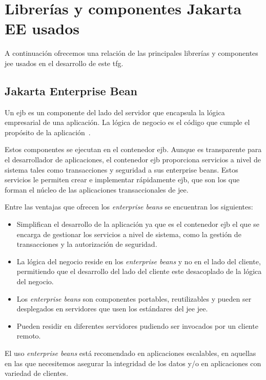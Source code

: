 \section{Librerías y componentes Jakarta EE usados}
\label{sec:componentesJakartaEE}

A continuación ofrecemos una relación de las principales librerías y componentes \acrshort{jee} usados en el desarrollo de este \acrshort{tfg}.

\subsection{Jakarta Enterprise Bean}
\label{sec:jeb}

Un \acrfull{ejb} es un componente del lado del servidor que encapsula la lógica empresarial de una aplicación. La lógica de negocio es el código que cumple el propósito de la aplicación~\cite{JEE7-Tutorial}.

Estos componentes se ejecutan en el contenedor \acrshort{ejb}. Aunque es transparente para el desarrollador de aplicaciones, el contenedor \acrshort{ejb} proporciona servicios a nivel de sistema tales como transacciones y seguridad a sus enterprise beans. Estos servicios le permiten crear e implementar rápidamente \acrshort{ejb}, que son los que forman el núcleo de las aplicaciones transaccionales de \acrshort{jee}.

Entre las ventajas que ofrecen los \textit{enterprise beans} se encuentran los siguientes:
\begin{itemize}
\item Simplifican el desarrollo de la aplicación ya que es el contenedor \acrshort{ejb} el que se encarga de gestionar los servicios a nivel de sistema, como la gestión de transacciones y la autorización de seguridad.
\item La lógica del negocio reside en los \textit{enterprise beans} y no en el lado del cliente, permitiendo que el desarrollo del lado del cliente este desacoplado de la lógica del negocio.
\item Los \textit{enterprise beans} son componentes portables, reutilizables y pueden ser desplegados en servidores que usen los estándares del  \acrshort{jee} \acrshort{jee}.
\item Pueden residir en diferentes servidores pudiendo ser invocados por un cliente remoto.
\end{itemize}

El uso \textit{enterprise beans} está recomendado en aplicaciones escalables, en aquellas en las que necesitemos asegurar la integridad de los datos y/o en aplicaciones con variedad de clientes.


